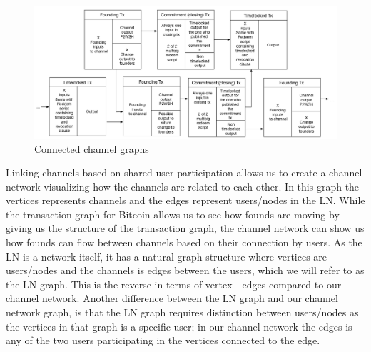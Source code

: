 \begin{figure}[h]
    \centering
    \includegraphics[width=14cm]{figures/graph_linking.png}
    \caption{Connected channel graphs}
    \label{fig:linking_graphs}
\end{figure}

Linking channels based on shared user participation allows us to create a channel network visualizing how the channels are related to each other.
In this graph the vertices represents channels and the edges represent users/nodes in the LN.
While the transaction graph for Bitcoin allows us to see how founds are moving by giving us the structure of the transaction graph, 
the channel network can show us how founds can flow between channels based on their connection by users.
As the LN is a network itself, it has a natural graph structure where vertices are users/nodes and the channels is edges between the users, which we will refer to as the LN graph.
This is the reverse in terms of vertex - edges compared to our channel network. Another difference between the LN graph and our channel network graph, is that the LN graph requires distinction between users/nodes as the vertices in that graph is a specific user; in our channel network the edges is any of the two users participating in the vertices connected to the edge.
\\

